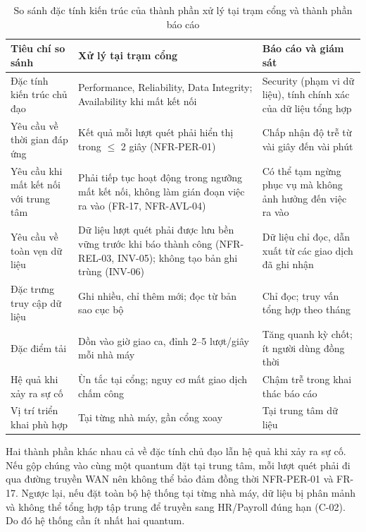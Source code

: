 \begin{table}[H]
\centering
\caption{So sánh đặc tính kiến trúc của thành phần xử lý tại trạm cổng và thành phần báo cáo}\label{tab:quantum-compare}
\small
\renewcommand{\arraystretch}{1.3}
\begin{tabularx}{\textwidth}{|>{\raggedright\arraybackslash}p{3.2cm}|>{\raggedright\arraybackslash}X|>{\raggedright\arraybackslash}X|}
\hline
\textbf{Tiêu chí so sánh} & \textbf{Xử lý tại trạm cổng} & \textbf{Báo cáo và giám sát} \\
\hline
Đặc tính kiến trúc chủ đạo & Performance, Reliability, Data Integrity; Availability khi mất kết nối & Security (phạm vi dữ liệu), tính chính xác của dữ liệu tổng hợp \\
\hline
Yêu cầu về thời gian đáp ứng & Kết quả mỗi lượt quét phải hiển thị trong $\le$ 2 giây (NFR-PER-01) & Chấp nhận độ trễ từ vài giây đến vài phút \\
\hline
Yêu cầu khi mất kết nối với trung tâm & Phải tiếp tục hoạt động trong ngưỡng mất kết nối, không làm gián đoạn việc ra vào (FR-17, NFR-AVL-04) & Có thể tạm ngừng phục vụ mà không ảnh hưởng đến việc ra vào \\
\hline
Yêu cầu về toàn vẹn dữ liệu & Dữ liệu lượt quét phải được lưu bền vững trước khi báo thành công (NFR-REL-03, INV-05); không tạo bản ghi trùng (INV-06) & Dữ liệu chỉ đọc, dẫn xuất từ các giao dịch đã ghi nhận \\
\hline
Đặc trưng truy cập dữ liệu & Ghi nhiều, chỉ thêm mới; đọc từ bản sao cục bộ & Chỉ đọc; truy vấn tổng hợp theo tháng \\
\hline
Đặc điểm tải & Dồn vào giờ giao ca, đỉnh 2--5 lượt/giây mỗi nhà máy & Tăng quanh kỳ chốt; ít người dùng đồng thời \\
\hline
Hệ quả khi xảy ra sự cố & Ùn tắc tại cổng; nguy cơ mất giao dịch chấm công & Chậm trễ trong khai thác báo cáo \\
\hline
Vị trí triển khai phù hợp & Tại từng nhà máy, gần cổng xoay & Tại trung tâm dữ liệu \\
\hline
\end{tabularx}
\end{table}

Hai thành phần khác nhau cả về đặc tính chủ đạo lẫn hệ quả khi xảy ra sự cố. Nếu gộp chúng vào cùng một quantum đặt tại trung tâm, mỗi lượt quét phải đi qua đường truyền WAN nên không thể bảo đảm đồng thời NFR-PER-01 và FR-17. Ngược lại, nếu đặt toàn bộ hệ thống tại từng nhà máy, dữ liệu bị phân mảnh và không thể tổng hợp tập trung để truyền sang HR/Payroll đúng hạn (C-02). Do đó hệ thống cần ít nhất hai quantum.

